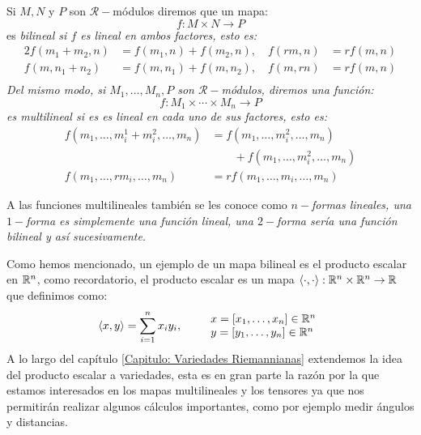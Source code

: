 \begin{definition}
	Si $M, N$ y $P$ son $\mathcal{R}-$módulos diremos que un mapa:
	\[
		f: M \times N \to P
	\]
	es \it{bilineal} si $f$ es lineal en ambos factores, esto es:
	\begin{alignat*}{2}
		f(m_1 + m_2, n) & = f(m_1,n) + f(m_2,n),\quad  f(rm,n) & = rf(m,n) \\
		f(m, n_1 + n_2) & = f(m,n_1) + f(m,n_2),\quad  f(m,rn) & = rf(m,n) \\
	\end{alignat*}
	Del mismo modo, si $M_1, \ldots, M_n, P$ son $\mathcal{R}-$módulos, diremos una función:
	\[
		f: M_1 \times \cdots \times M_n \to P
	\]
	es \it{multilineal} si es es lineal en cada uno de sus factores, esto es:
	\begin{align*}
		f(m_1, \ldots, m_i^1 + m_i^2, \ldots, m_n) & = f(m_1, \ldots, m_i^2, \ldots, m_n)           \\
		                                           & \quad\quad +f(m_1, \ldots, m_i^2, \ldots, m_n) \\
		f(m_1,\ldots , rm_i, \ldots, m_n)          & = r f(m_1,\ldots,m_i,\ldots, m_n)
	\end{align*}
\end{definition}

A las funciones multilineales también se les conoce como \it{$n-$formas lineales}, una $1-$forma es simplemente una función lineal, una $2-$forma sería una función bilineal y así sucesivamente.

Como hemos mencionado, un ejemplo de un mapa bilineal es el producto escalar en $\mathbb{R}^n$, como recordatorio, el producto escalar es un mapa $\langle \cdot , \cdot \rangle: \mathbb{R}^n \times \mathbb{R}^n \to \mathbb{R}$ que definimos como:
\[
	\langle x,y \rangle = \sum_{i=1}^{n} x_i y_i, \quad\quad
	\begin{array}{l}
		x=[x_1,\dots,x_n] \in \mathbb{R}^n \\
		y=[y_1,\dots,y_n] \in \mathbb{R}^n
	\end{array}
\]
A lo largo del capítulo \ref{Capitulo: Variedades Riemannianas} extendemos la idea del producto escalar a variedades, esta es en gran parte la razón por la que estamos interesados en los mapas multilineales y los tensores ya que nos permitirán realizar algunos cálculos importantes, como por ejemplo medir ángulos y distancias.

